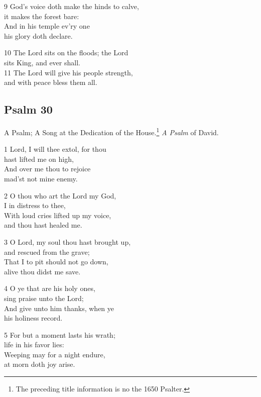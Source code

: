 9 God’s voice doth make the hinds to calve,\\
it makes the forest bare:\\
And in his temple ev’ry one\\
his glory doth declare.

10 The Lord sits on the floods; the Lord\\
sits King, and ever shall.\\
11 The Lord will give his people strength,\\
and with peace bless them all.\\

\begin{center}
\quad{}\quad{}
\end{center}

\subsection*{Psalm 30}

A Psalm; A Song at the Dedication of the House.\footnote{The preceding title information is no the 1650 Psalter.}
\emph{A Psalm} of David.

1 Lord, I will thee extol, for thou\\
hast lifted me on high,\\
And over me thou to rejoice\\
mad’st not mine enemy.

2 O thou who art the Lord my God,\\
I in distress to thee,\\
With loud cries lifted up my voice,\\
and thou hast healed me.

3 O Lord, my soul thou hast brought up,\\
and rescued from the grave;\\
That I to pit should not go down,\\
alive thou didst me save.

4 O ye that are his holy ones,\\
sing praise unto the Lord;\\
And give unto him thanks, when ye\\
his holiness record.

5 For but a moment lasts his wrath;\\
life in his favor lies:\\
Weeping may for a night endure,\\
at morn doth joy arise.

